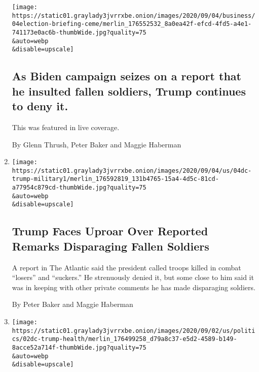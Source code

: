 \begin{enumerate}
  \texttt{[image: https://static01.graylady3jvrrxbe.onion/images/2020/09/04/business/04election-briefing-ceme/merlin\_176552532\_8a0ea42f-efcd-4fd5-a4e1-741173e0ac6b-thumbWide.jpg?quality=75\\\&auto=webp\\\&disable=upscale]}

  \hypertarget{as-biden-campaign-seizes-on-a-report-that-he-insulted-fallen-soldiers-trump-continues-to-deny-it}{%
  \subsection{As Biden campaign seizes on a report that he insulted
  fallen soldiers, Trump continues to deny
  it.}\label{as-biden-campaign-seizes-on-a-report-that-he-insulted-fallen-soldiers-trump-continues-to-deny-it}}

  This was featured in live coverage.

  By Glenn Thrush, Peter Baker and Maggie Haberman
\item
  \href{/2020/09/04/us/politics/trump-veterans-losers.html}{}

  \texttt{[image: https://static01.graylady3jvrrxbe.onion/images/2020/09/04/us/04dc-trump-military1/merlin\_176592819\_131b4765-15a4-4d5c-81cd-a77954c879cd-thumbWide.jpg?quality=75\\\&auto=webp\\\&disable=upscale]}

  \hypertarget{trump-faces-uproar-over-reported-remarks-disparaging-fallen-soldiers}{%
  \subsection{Trump Faces Uproar Over Reported Remarks Disparaging
  Fallen
  Soldiers}\label{trump-faces-uproar-over-reported-remarks-disparaging-fallen-soldiers}}

  A report in The Atlantic said the president called troops killed in
  combat ``losers'' and ``suckers.'' He strenuously denied it, but some
  close to him said it was in keeping with other private comments he has
  made disparaging soldiers.

  By Peter Baker and Maggie Haberman
\item
  \href{/2020/09/03/us/elections/as-he-questions-his-opponents-health-trump-finds-his-own-under-scrutiny.html}{}

  \texttt{[image: https://static01.graylady3jvrrxbe.onion/images/2020/09/02/us/politics/02dc-trump-health/merlin\_176499258\_d79a8c37-e5d2-4589-b149-8acce52a714f-thumbWide.jpg?quality=75\\\&auto=webp\\\&disable=upscale]}

  \hypertarget{as-he-questions-his-opponents-health-trump-finds-his-own-under-scrutiny}{%
}
\end{enumerate}
